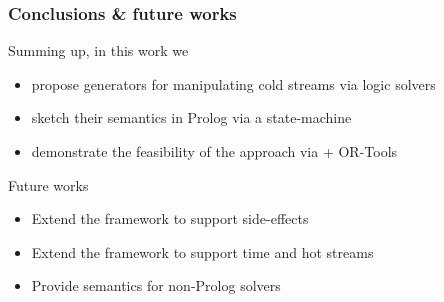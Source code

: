 \documentclass[presentation]{beamer}
\begin{document}
\begin{frame}%
\frametitle{Conclusions \& future works}

\begin{block}{Summing up, in this work we}
    \begin{itemize}
        \item propose generators for manipulating cold streams via logic solvers
        \item sketch their semantics in Prolog via a state-machine
        \item demonstrate the feasibility of the approach via \twopkt{} + OR-Tools
    \end{itemize}
\end{block}

\begin{exampleblock}{Future works}
    \begin{itemize}
        \item Extend the framework to support side-effects
        \item Extend the framework to support time and hot streams
        \item Provide semantics for non-Prolog solvers
    \end{itemize}
\end{exampleblock}

\end{frame}

\section*{}
\frame{\titlepage}
\end{document}
